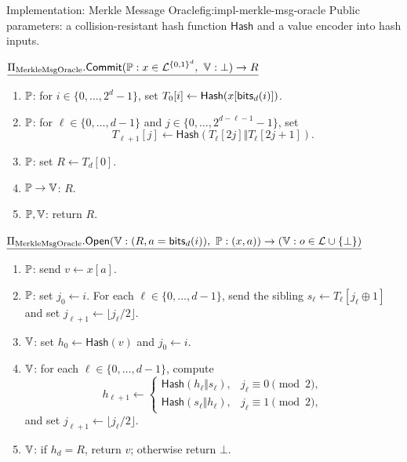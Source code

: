 \begin{protocolbox}{Implementation: Merkle Message Oracle}{fig:impl-merkle-msg-oracle}
\noindent Public parameters: a collision-resistant hash function
\(\mathsf{Hash}\) and a value encoder into hash inputs.

\smallskip
\noindent\(\underline{\Pi_{\mathrm{MerkleMsgOracle}}.\mathsf{Commit}(\mathbb{P}:x\in\mathcal L^{\{0,1\}^d},\ \mathbb{V}:\bot)\to R}\)

\smallskip
\begin{enumerate}[leftmargin=0.24in,label=\textbf{M\arabic*.},itemsep=0.08em,topsep=0.1em,parsep=0pt]
  \item \(\mathbb{P}\): for \(i\in\{0,\ldots,2^d-1\}\), set
        \(T_0[i]\gets\mathsf{Hash}(x[\mathsf{bits}_d(i)])\).
  \item \(\mathbb{P}\): for \(\ell\in\{0,\ldots,d-1\}\) and
        \(j\in\{0,\ldots,2^{d-\ell-1}-1\}\), set
        \[
          T_{\ell+1}[j]
          \gets
          \mathsf{Hash}(T_\ell[2j]\Vert T_\ell[2j+1]).
        \]
  \item \(\mathbb{P}\): set \(R\gets T_d[0]\).
  \item \(\mathbb{P}\to\mathbb{V}\): \(R\).
  \item \(\mathbb{P},\mathbb{V}\): return \(R\).
\end{enumerate}

\smallskip
\noindent\(\underline{\Pi_{\mathrm{MerkleMsgOracle}}.\mathsf{Open}(\verifier:(R,a=\bits_d(i)),\ \prover:(x,a))\to(\verifier:o\in\mathcal L\cup\{\bot\})}\)

\smallskip
\begin{enumerate}[leftmargin=0.24in,label=\textbf{O\arabic*.},itemsep=0.08em,topsep=0.1em,parsep=0pt]
  \item \(\mathbb{P}\): send \(v\gets x[a]\).
  \item \(\mathbb{P}\): set \(j_0\gets i\).  For each
        \(\ell\in\{0,\ldots,d-1\}\), send the sibling
        \(s_\ell\gets T_\ell[j_\ell\oplus1]\) and set
        \(j_{\ell+1}\gets\lfloor j_\ell/2\rfloor\).
  \item \(\mathbb{V}\): set \(h_0\gets\mathsf{Hash}(v)\) and \(j_0\gets i\).
  \item \(\mathbb{V}\): for each \(\ell\in\{0,\ldots,d-1\}\), compute
        \[
          h_{\ell+1}\gets
          \begin{cases}
            \mathsf{Hash}(h_\ell\Vert s_\ell), & j_\ell\equiv0\pmod 2,\\
            \mathsf{Hash}(s_\ell\Vert h_\ell), & j_\ell\equiv1\pmod 2,
          \end{cases}
        \]
        and set \(j_{\ell+1}\gets\lfloor j_\ell/2\rfloor\).
  \item \(\mathbb{V}\): if \(h_d=R\), return \(v\); otherwise return \(\bot\).
\end{enumerate}
\end{protocolbox}

